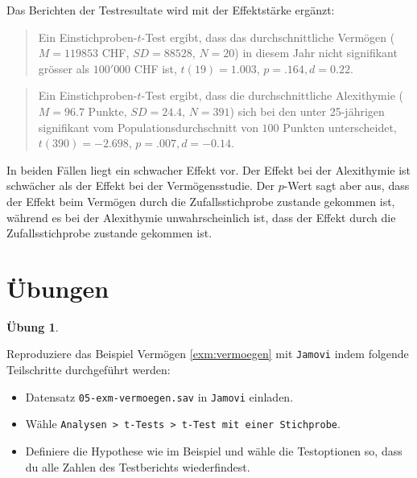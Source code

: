 \documentclass[
]{book}
\providecommand{\tightlist}{%
  \setlength{\itemsep}{0pt}\setlength{\parskip}{0pt}}
\theoremstyle{definition}
\theoremstyle{definition}
\theoremstyle{definition}
\newtheorem{exercise}{Übung}[chapter]
\theoremstyle{definition}
\theoremstyle{remark}
\begin{document}
Das Berichten der Testresultate wird mit der Effektstärke ergänzt:

\begin{quote}
Ein Einstichproben-\(t\)-Test ergibt, dass das durchschnittliche Vermögen (\(M = 119853\) CHF, \(SD = 88528\), \(N = 20\)) in diesem Jahr nicht signifikant grösser als \(100'000\) CHF ist, \(t(19) = 1.003\), \(p = .164, d = 0.22\).
\end{quote}

\begin{quote}
Ein Einstichproben-\(t\)-Test ergibt, dass die durchschnittliche Alexithymie (\(M = 96.7\) Punkte, \(SD = 24.4\), \(N = 391\)) sich bei den unter 25-jährigen signifikant vom Populationsdurchschnitt von \(100\) Punkten unterscheidet, \(t(390) = -2.698\), \(p = .007, d = -0.14\).
\end{quote}

In beiden Fällen liegt ein schwacher Effekt vor. Der Effekt bei der Alexithymie ist schwächer als der Effekt bei der Vermögensstudie. Der \(p\)-Wert sagt aber aus, dass der Effekt beim Vermögen durch die Zufallsstichprobe zustande gekommen ist, während es bei der Alexithymie unwahrscheinlich ist, dass der Effekt durch die Zufallsstichprobe zustande gekommen ist.

\section{Übungen}\label{uxfcbungen-2}

\begin{exercise}
\protect\hypertarget{exr:vermoegen}{}\label{exr:vermoegen}\leavevmode

Reproduziere das Beispiel Vermögen \ref{exm:vermoegen} mit \texttt{Jamovi} indem folgende Teilschritte durchgeführt werden:

\begin{itemize}
\tightlist
\item
  Datensatz \texttt{05-exm-vermoegen.sav} in \texttt{Jamovi} einladen.
\item
  Wähle \texttt{Analysen\ \textgreater{}\ t-Tests\ \textgreater{}\ t-Test\ mit\ einer\ Stichprobe}.
\item
  Definiere die Hypothese wie im Beispiel und wähle die Testoptionen so, dass du alle Zahlen des Testberichts wiederfindest.
\end{itemize}

\end{exercise}
\end{document}
